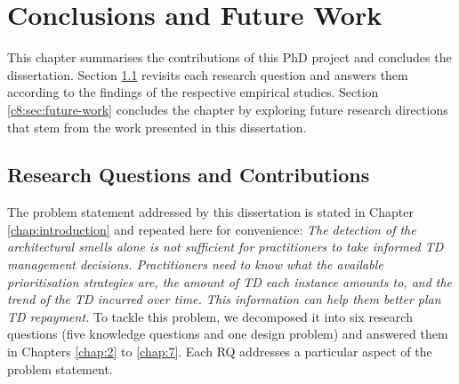 \setlength{\headheight}{1.2cm}
\renewcommand{\publ}{\flushleft\footnotesize{}}

\chapter{Conclusions and Future Work}\label{chap:8}
This chapter summarises the contributions of this PhD project and concludes the dissertation.
Section \ref{c8:sec:rq-contributions} revisits each research question and answers them according to the findings of the respective empirical studies.
Section \ref{c8:sec:future-work} concludes the chapter by exploring future research directions that stem from the work presented in this dissertation.

\section{Research Questions and Contributions}\label{c8:sec:rq-contributions}
The problem statement addressed by this dissertation is stated in Chapter \ref{chap:introduction} and repeated here for convenience: \textit{The detection of the architectural smells alone is not sufficient for practitioners to take informed TD management decisions. Practitioners need to know what the available prioritisation strategies are, the amount of TD each instance amounts to, and the trend of the TD incurred over time. This information can help them better plan TD repayment.}
To tackle this problem, we decomposed it into six research questions (five knowledge questions and one design problem) and answered them in Chapters \ref{chap:2} to \ref{chap:7}.
Each RQ addresses a particular aspect of the problem statement.

